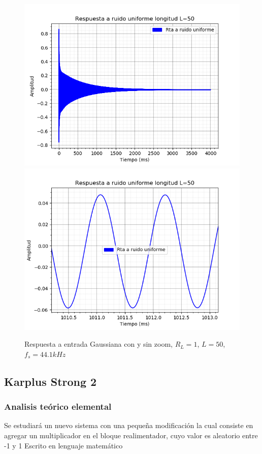 \documentclass[assd_tp2_main.tex]{subfiles}
\begin{document}
\begin{figure}[H]
	\includegraphics[scale=0.55]{graficos/randomBloqueS1.png}
	\includegraphics[scale=0.55]{graficos/randomBloqueS1zoom.png}
	\caption{Respuesta a entrada Gaussiana con y sin zoom, $R_L=1$, $L=50$, $f_s=44.1kHz$}
\end{figure}

\subsection{Karplus Strong 2}

\subsubsection{Analisis teórico elemental}
Se estudiará un nuevo sistema con una pequeña modificación la cual consiste en agregar un multiplicador en el bloque realimentador, cuyo valor es aleatorio entre -1 y 1
Escrito en lenguaje matemático
\end{document}
